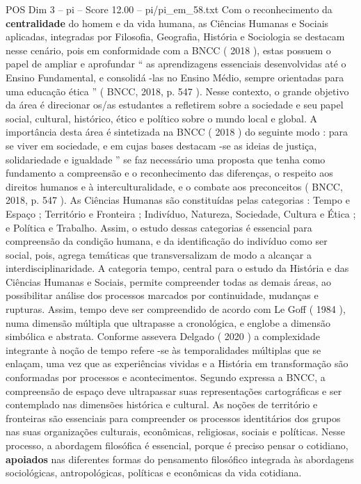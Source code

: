 \begin{textsample}{POS Dim 3 – pi – Score 12.00 – pi/pi\_em\_58.txt}
Com o reconhecimento da \textbf{centralidade} do homem e da vida humana, as Ciências Humanas e Sociais aplicadas, integradas por Filosofia, Geografia, História e Sociologia se destacam nesse cenário, pois em conformidade com a BNCC ( 2018 ), estas possuem o papel de ampliar e aprofundar “ as aprendizagens essenciais desenvolvidas até o Ensino Fundamental, e consolidá -las no Ensino Médio, sempre orientadas para uma educação ética ” ( BNCC, 2018, p. 547 ).
Nesse contexto, o grande objetivo da área é direcionar os/as estudantes a refletirem sobre a sociedade e seu papel social, cultural, histórico, ético e político sobre o mundo local e global.
A importância desta área é sintetizada na BNCC ( 2018 ) do seguinte modo : para se viver em sociedade, e em cujas bases destacam -se as ideias de justiça, solidariedade e igualdade ” se faz necessário uma proposta que tenha como fundamento a compreensão e o reconhecimento das diferenças, o respeito aos direitos humanos e à interculturalidade, e o combate aos preconceitos ( BNCC, 2018, p. 547 ).
As Ciências Humanas são constituídas pelas categorias : Tempo e Espaço ; Território e Fronteira ; Indivíduo, Natureza, Sociedade, Cultura e Ética ; e Política e Trabalho.
Assim, o estudo dessas categorias é essencial para compreensão da condição humana, e da identificação do indivíduo como ser social, pois, agrega temáticas que transversalizam de modo a alcançar a interdisciplinaridade.
A categoria tempo, central para o estudo da História e das Ciências Humanas e Sociais, permite compreender todas as demais áreas, ao possibilitar análise dos processos marcados por continuidade, mudanças e rupturas.
Assim, tempo deve ser compreendido de acordo com Le Goff ( 1984 ), numa dimensão múltipla que ultrapasse a cronológica, e englobe a dimensão simbólica e abstrata.
Conforme assevera Delgado ( 2020 ) a complexidade integrante à noção de tempo refere -se às temporalidades múltiplas que se enlaçam, uma vez que as experiências vividas e a História em transformação são conformadas por processos e acontecimentos.
Segundo expressa a BNCC, a compreensão de espaço deve ultrapassar suas representações cartográficas e ser contemplado nas dimensões histórica e cultural.
As noções de território e fronteiras são essenciais para compreender os processos identitários dos grupos nas suas organizações culturais, econômicas, religiosas, sociais e políticas.
Nesse processo, a abordagem filosófica é essencial, porque é preciso pensar o cotidiano, \textbf{apoiados} nas diferentes formas do pensamento filosófico integrada às abordagens sociológicas, antropológicas, políticas e econômicas da vida cotidiana.

\end{textsample}
